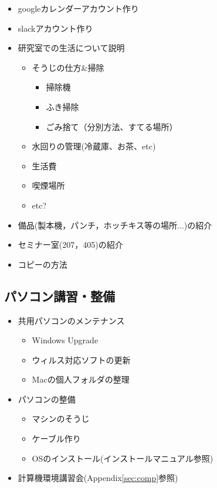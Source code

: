 \documentclass[twocolumn,11pt]{jsarticle}
\begin{document}
\begin{itemize}
\item googleカレンダーアカウント作り
\item slackアカウント作り
\item 研究室での生活について説明
  \begin{itemize}
  \item そうじの仕方\&掃除
    \begin{itemize}
    \item 掃除機
    \item ふき掃除
    \item ごみ捨て（分別方法、すてる場所）
    \end{itemize}
  \item 水回りの管理(冷蔵庫、お茶、etc)
  \item 生活費
  \item 喫煙場所
  \item etc?
  \end{itemize}
\item 備品(製本機，パンチ，ホッチキス等の場所...)の紹介
\item セミナー室(207，405)の紹介
\item コピーの方法
\end{itemize}


\subsection{パソコン講習・整備}
\begin{itemize}
\item 共用パソコンのメンテナンス
  \begin{itemize}
  \item Windows Upgrade
  \item ウィルス対応ソフトの更新
  \item Macの個人フォルダの整理
  \end{itemize}

\item パソコンの整備
  \begin{itemize}
  \item マシンのそうじ
  \item ケーブル作り
  \item OSのインストール(インストールマニュアル参照)
  \end{itemize}
\item 計算機環境講習会(Appendix\ref{sec:comp}参照)
\end{itemize}
\end{document}
